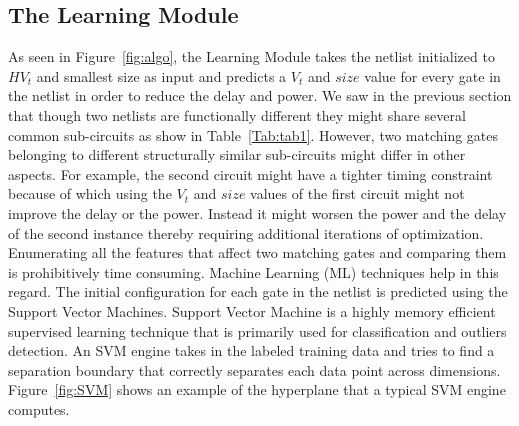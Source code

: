 \subsection{The Learning Module}
\label{sec:feature}
\noindent As seen in Figure~\ref{fig:algo}, the Learning Module takes the netlist initialized to $HV_t$%
and smallest size as input and predicts a $V_t$ and $size$ value for every gate in the netlist in order to reduce the delay and power. We saw in the previous section that though two netlists are functionally different they might share several common sub-circuits as show in Table~\ref{Tab:tab1}. However, two matching gates belonging to different structurally similar sub-circuits might differ in other aspects. For example, the second circuit might have a tighter timing constraint because of which using the $V_t$ and $size$ values of the first circuit might not improve the delay or the power. Instead it might worsen the power and the delay of the second instance thereby requiring additional iterations of optimization. Enumerating all the features that affect two matching gates and comparing them is prohibitively time consuming. Machine Learning (ML) techniques help in this regard. 
\noindent The initial configuration for each gate in the netlist is predicted using the Support Vector Machines.  Support Vector Machine \cite{SVM} is a highly memory efficient supervised learning technique that is primarily used for classification and outliers detection. An SVM engine takes in the labeled training data and tries to find a separation boundary that correctly separates each data point across dimensions. Figure~\ref{fig:SVM} shows an example of the hyperplane that a typical SVM engine computes. 

